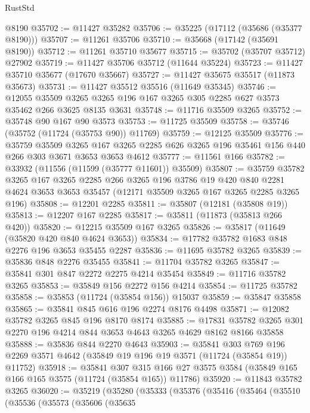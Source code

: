 \begin{lexlean}{RustStd}
\begin{coremodule}
    @8190
@35702 := @11427 @35282
@35706 := @35225 (@17112 (@35686 (@35377 @8190)))
@35707 := @11261 @35706
@35710 := @35668 (@17142 (@35691 @8190))
@35712 := @11261 @35710 @35677
@35715 := @35702 (@35707 @35712) @27902
@35719 := @11427 @35706 @35712 (@11644 @35224)
@35723 := @11427 @35710 @35677 (@17670 @35667)
@35727 := @11427 @35675 @35517 (@11873 @35673)
@35731 := @11427 @35512 @35516 (@11649 @35345)
@35746 := @12055
    @35509
    @3265
    @3265
    @196
    @167
    @3265
    @305
    @2285
    @627
    @3573
    @35462
    @266
    @3625
    @8135
    @3631
@35748 := @11716 @35509 @3265
@35752 := @35748 @90 @167 @90 @3573
@35753 := @11725 @35509
@35758 := @35746 (@35752 (@11724 (@35753 @90)) @11769)
@35759 := @12125 @35509
@35776 := @35759
    @35509
    @3265
    @167
    @3265
    @2285
    @626
    @3265
    @196
    @35461
    @156
    @440
    @266
    @303
    @3671
    @3653
    @3653
    @4612
@35777 := @11561 @166
@35782 := @33932 (@11556 (@11599 (@35777 @11601)) @35509)
@35807 := @35759
    @35782
    @3265
    @167
    @3265
    @2285
    @266
    @3265
    @196
    @3786
    @19
    @420
    @840
    @2281
    @4624
    @3653
    @3653
    @35457
    (@12171 @35509 @3265 @167 @3265 @2285 @3265 @196)
@35808 := @12201 @2285
@35811 := @35807 (@12181 (@35808 @19))
@35813 := @12207 @167 @2285
@35817 := @35811 (@11873 (@35813 @266 @420))
@35820 := @12215 @35509 @167 @3265
@35826 := @35817 (@11649 (@35820 @420 @840 @4624 @3653))
@35834 := @17782 @35782 @1683 @848 @2276 @196 @3653 @35455 @2287
@35836 := @11695 @35782 @3265
@35839 := @35836 @848 @2276 @35455
@35841 := @11704 @35782 @3265
@35847 := @35841 @301 @847 @2272 @2275 @4214 @35454
@35849 := @11716 @35782 @3265
@35853 := @35849 @156 @2272 @156 @4214
@35854 := @11725 @35782
@35858 := @35853 (@11724 (@35854 @156)) @15037
@35859 := @35847 @35858
@35865 := @35841 @845 @616 @196 @2274 @8176 @4498
@35871 := @12082 @35782 @3265 @845 @196 @8170 @8174
@35885 := @17831 @35782 @3265 @301 @2270 @196 @4214 @844 @3653 @4643 @3265 @4629 @8162 @8166 @35858
@35888 := @35836 @844 @2270 @4643
@35903 := @35841
    @303
    @769
    @196
    @2269
    @3571
    @4642
    (@35849 @19 @196 @19 @3571 (@11724 (@35854 @19)) @11752)
@35918 := @35841
    @307
    @315
    @166
    @27
    @3575
    @3584
    (@35849 @165 @166 @165 @3575 (@11724 (@35854 @165)) @11786)
@35920 := @11843 @35782 @3265
@36020 := @35219
    (@35280
      (@35333
        (@35376
          (@35416
            (@35464
              (@35510
                (@35536
                  (@35573
                    (@35606
                      (@35635

\end{coremodule}
\end{lexlean}
